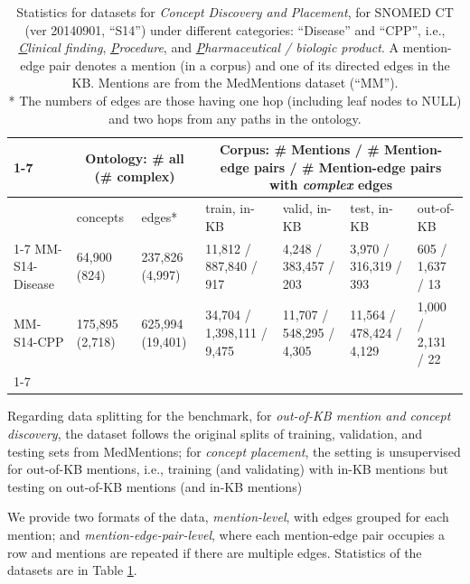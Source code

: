 \documentclass[sigconf]{acmart}
\begin{document}
	\begin{table}[ht]
		\small
		\caption{Statistics for datasets for \textit{Concept Discovery and Placement}, for SNOMED CT (ver 20140901, ``S14'') under different categories: ``Disease'' and ``CPP'', i.e., \textit{\underline{C}linical finding}, \textit{\underline{P}rocedure}, and \textit{\underline{P}harmaceutical / biologic product}. A mention-edge pair denotes a mention (in a corpus) and one of its directed edges in the KB. 
			Mentions are from the MedMentions dataset (``MM''). \\ 
			* The numbers of edges are those having one hop (including leaf nodes to NULL) and two hops from any paths in the ontology.
		}\label{data-statistics}
		\begin{tabular}{l|l|l|lll|l}
			\cline{1-7}
			
			& \multicolumn{2}{c}{Ontology: \# all (\# complex) }                                           & \multicolumn{4}{|c}{Corpus: \# Mentions / \# Mention-edge pairs / \# Mention-edge pairs with \textit{complex} edges}                             \\ \hline                       & concepts & edges* & train, in-KB   & valid, in-KB & test, in-KB & out-of-KB \\
			\cline{1-7}
			MM-S14-Disease & 64,900 (824)        & 237,826 (4,997)      & 11,812 / 887,840 / 917  & 4,248 / 383,457 / 203    & 3,970 / 316,319 / 393    & 605 / 1,637 / 13 \\             
			MM-S14-CPP     & 175,895 (2,718)      & 625,994 (19,401)     & 34,704 / 1,398,111 / 9,475 & 11,707 / 548,295 / 4,305     & 11,564 / 478,424 / 4,129     & 1,000 / 2,131 / 22                  \\
			\cline{1-7}
		\end{tabular}
	\end{table}
	
	Regarding data splitting for the benchmark, for \textit{out-of-KB mention and concept discovery}, the dataset follows the original splits of training, validation, and testing sets from MedMentions; for \textit{concept placement}, the setting is unsupervised for out-of-KB mentions, i.e., training (and validating) with in-KB mentions but testing on out-of-KB mentions (and in-KB mentions)
	
	We provide two formats of the data, \textit{mention-level}, with edges grouped for each mention; and \textit{mention-edge-pair-level}, where each mention-edge pair occupies a row and mentions are repeated if there are multiple edges. Statistics of the datasets are in Table \ref{data-statistics}. 
	
\end{document}
